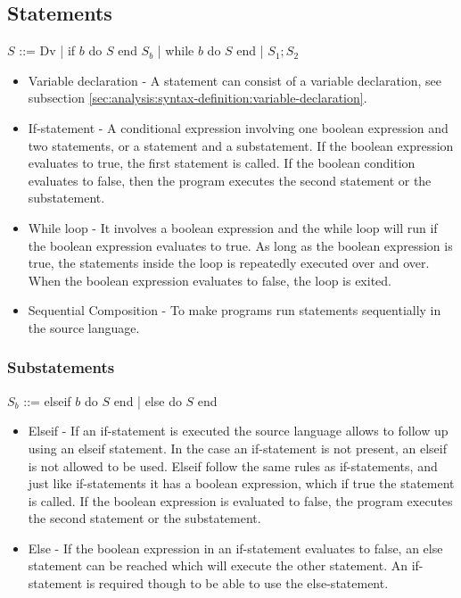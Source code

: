 \subsection{Statements}

$S$ ::= Dv | if $b$ do $S$ end $S_b$ | while $b$ do $S$ end | $S_1 ; S_2$

\begin{itemize}
	\item Variable declaration - A statement can consist of a variable declaration, see subsection \ref{sec:analysis:syntax-definition:variable-declaration}.
	\item If-statement -  A conditional expression involving one boolean expression and two statements, or a statement and a substatement. If the boolean expression evaluates to true, the first statement is called. If the boolean condition evaluates to false, then the program executes the second statement or the substatement.

	\item While loop - It involves a boolean expression and the while loop will run if the boolean expression evaluates to true. As long as the boolean expression is true, the statements inside the loop is repeatedly executed over and over. When the boolean expression evaluates to false, the loop is exited.
	\item Sequential Composition - To make programs run statements sequentially in the source language.
\end{itemize}

\subsubsection{Substatements}

$S_b$ ::= {elseif $b$ do $S$ end} | else do $S$ end

\begin{itemize}
	\item Elseif - If an if-statement is executed the source language allows to follow up using an elseif statement. In the case an if-statement is not present, an elseif is not allowed to be used. Elseif follow the same rules as if-statements, and just like if-statements it has a boolean expression, which if true the statement is called. If the boolean expression is evaluated to false, the program executes the second statement or the substatement.
	\item Else - If the boolean expression in an if-statement evaluates to false, an else statement can be reached which will execute the other statement. An if-statement is required though to be able to use the else-statement.
\end{itemize}

